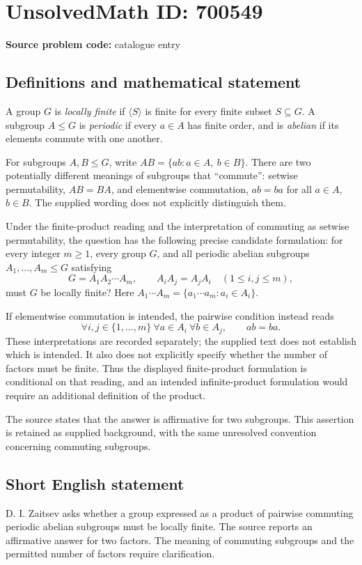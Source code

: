 \documentclass[11pt]{article}
\begin{document}
\section*{UnsolvedMath ID: 700549}
\textbf{Source problem code:} catalogue entry
\subsection{Definitions and mathematical statement}
A group \(G\) is \emph{locally finite} if \(\langle S\rangle\) is finite for every finite subset \(S\subseteq G\). A subgroup \(A\leq G\) is \emph{periodic} if every \(a\in A\) has finite order, and is \emph{abelian} if its elements commute with one another.

For subgroups \(A,B\leq G\), write \(AB=\{ab:a\in A,\ b\in B\}\). There are two potentially different meanings of subgroups that ``commute'': setwise permutability, \(AB=BA\), and elementwise commutation, \(ab=ba\) for all \(a\in A\), \(b\in B\). The supplied wording does not explicitly distinguish them.

Under the finite-product reading and the interpretation of commuting as setwise permutability, the question has the following precise candidate formulation: for every integer \(m\geq1\), every group \(G\), and all periodic abelian subgroups \(A_1,\ldots,A_m\leq G\) satisfying
\[
G=A_1A_2\cdots A_m,
\qquad
A_iA_j=A_jA_i\quad(1\leq i,j\leq m),
\]
must \(G\) be locally finite? Here \(A_1\cdots A_m=\{a_1\cdots a_m:a_i\in A_i\}\).

If elementwise commutation is intended, the pairwise condition instead reads
\[
\forall i,j\in\{1,\ldots,m\}\ \forall a\in A_i\ \forall b\in A_j,
\qquad ab=ba.
\]
These interpretations are recorded separately; the supplied text does not establish which is intended. It also does not explicitly specify whether the number of factors must be finite. Thus the displayed finite-product formulation is conditional on that reading, and an intended infinite-product formulation would require an additional definition of the product.

The source states that the answer is affirmative for two subgroups. This assertion is retained as supplied background, with the same unresolved convention concerning commuting subgroups.
\subsection{Short English statement}
D. I. Zaitsev asks whether a group expressed as a product of pairwise commuting periodic abelian subgroups must be locally finite. The source reports an affirmative answer for two factors. The meaning of commuting subgroups and the permitted number of factors require clarification.
\end{document}
